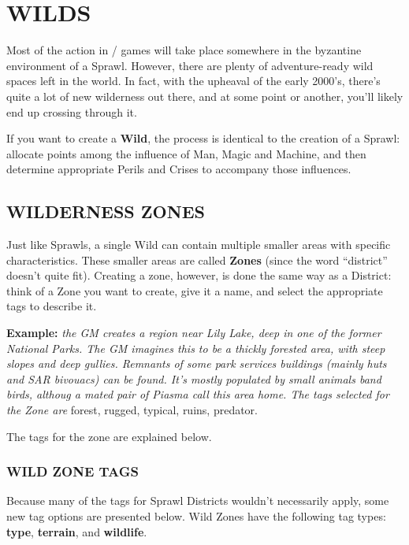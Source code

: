 \documentclass[oneside,10pt]{article}
\begin{document}
\section{WILDS}
\begin{multicols}{2}
Most of the action in \SW/ games will take place somewhere in the byzantine environment of a Sprawl. However,
there are plenty of adventure-ready wild spaces left in the
world. In fact, with the upheaval of the early 2000’s, there’s
quite a lot of new wilderness out there, and at some point or
another, you’ll likely end up crossing through it.

If you want to create a \textbf{Wild}, the process is identical to the
creation of a Sprawl: allocate points among the influence of
Man, Magic and Machine, and then determine appropriate
Perils and Crises to accompany those influences.

\subsection{WILDERNESS ZONES}
Just like Sprawls, a single Wild can contain multiple smaller areas with specific characteristics. These smaller areas are
called \textbf{Zones} (since the word ``district'' doesn’t quite fit). Creating a zone, however, is done the same way as a District:
think of a Zone you want to create, give it a name, and select
the appropriate tags to describe it.
\begin{dent}

\textbf{Example:} \textit{the GM creates a region near Lily Lake, deep in
one of the former National Parks. The GM imagines this
to be a thickly forested area, with steep slopes and deep
gullies. Remnants of some park services buildings (mainly
huts and SAR bivouacs) can be found. It’s mostly populated by small animals band birds, althoug a mated pair of
Piasma call this area home. The tags selected for the Zone
are} forest, rugged, typical, ruins, predator.
\end{dent}

The tags for the zone are explained below.

\subsubsection{WILD ZONE TAGS}
Because many of the tags for Sprawl Districts wouldn’t necessarily apply, some new tag options are presented below.
Wild Zones have the following tag types: \textbf{type}, \textbf{terrain}, and
\textbf{wildlife}.


\end{multicols}
\end{document}
